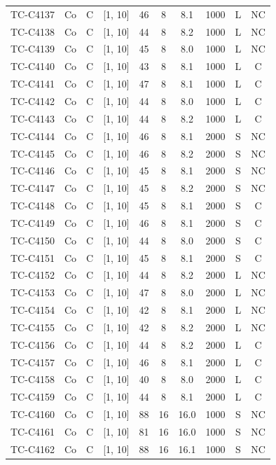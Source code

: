 \begin{longtable}{lccccccccc}
TC-C4137 & Co & C & [1, 10] & 46 & 8 & 8.1 & 1000 & L & NC \\
TC-C4138 & Co & C & [1, 10] & 44 & 8 & 8.2 & 1000 & L & NC \\
TC-C4139 & Co & C & [1, 10] & 45 & 8 & 8.0 & 1000 & L & NC \\
TC-C4140 & Co & C & [1, 10] & 43 & 8 & 8.1 & 1000 & L & C \\
TC-C4141 & Co & C & [1, 10] & 47 & 8 & 8.1 & 1000 & L & C \\
TC-C4142 & Co & C & [1, 10] & 44 & 8 & 8.0 & 1000 & L & C \\
TC-C4143 & Co & C & [1, 10] & 44 & 8 & 8.2 & 1000 & L & C \\
TC-C4144 & Co & C & [1, 10] & 46 & 8 & 8.1 & 2000 & S & NC \\
TC-C4145 & Co & C & [1, 10] & 46 & 8 & 8.2 & 2000 & S & NC \\
TC-C4146 & Co & C & [1, 10] & 45 & 8 & 8.1 & 2000 & S & NC \\
TC-C4147 & Co & C & [1, 10] & 45 & 8 & 8.2 & 2000 & S & NC \\
TC-C4148 & Co & C & [1, 10] & 45 & 8 & 8.1 & 2000 & S & C \\
TC-C4149 & Co & C & [1, 10] & 46 & 8 & 8.1 & 2000 & S & C \\
TC-C4150 & Co & C & [1, 10] & 44 & 8 & 8.0 & 2000 & S & C \\
TC-C4151 & Co & C & [1, 10] & 45 & 8 & 8.1 & 2000 & S & C \\
TC-C4152 & Co & C & [1, 10] & 44 & 8 & 8.2 & 2000 & L & NC \\
TC-C4153 & Co & C & [1, 10] & 47 & 8 & 8.0 & 2000 & L & NC \\
TC-C4154 & Co & C & [1, 10] & 42 & 8 & 8.1 & 2000 & L & NC \\
TC-C4155 & Co & C & [1, 10] & 42 & 8 & 8.2 & 2000 & L & NC \\
TC-C4156 & Co & C & [1, 10] & 44 & 8 & 8.2 & 2000 & L & C \\
TC-C4157 & Co & C & [1, 10] & 46 & 8 & 8.1 & 2000 & L & C \\
TC-C4158 & Co & C & [1, 10] & 40 & 8 & 8.0 & 2000 & L & C \\
TC-C4159 & Co & C & [1, 10] & 44 & 8 & 8.1 & 2000 & L & C \\
TC-C4160 & Co & C & [1, 10] & 88 & 16 & 16.0 & 1000 & S & NC \\
TC-C4161 & Co & C & [1, 10] & 81 & 16 & 16.0 & 1000 & S & NC \\
TC-C4162 & Co & C & [1, 10] & 88 & 16 & 16.1 & 1000 & S & NC \\

\end{longtable}
